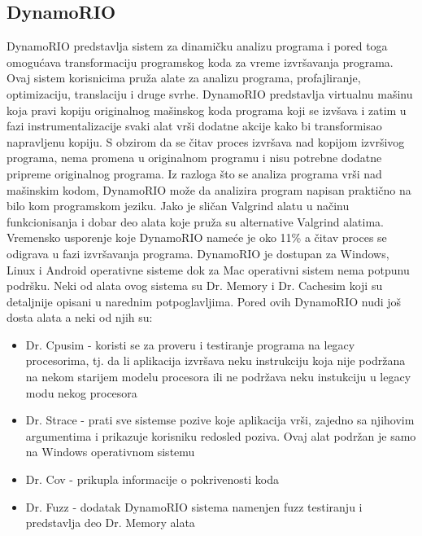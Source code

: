 \documentclass[a4paper]{article}
\begin{document}
\subsection{DynamoRIO}
DynamoRIO predstavlja sistem za dinamičku analizu programa i pored toga omogućava transformaciju programskog koda za vreme izvršavanja programa. Ovaj sistem korisnicima pruža alate za analizu programa, profajliranje, optimizaciju, translaciju i druge svrhe. DynamoRIO predstavlja virtualnu mašinu koja pravi kopiju originalnog mašinskog koda programa koji se izvšava i zatim u fazi instrumentalizacije svaki alat vrši dodatne akcije kako bi transformisao napravljenu kopiju. S obzirom da se čitav proces izvršava nad kopijom izvršivog programa, nema promena u originalnom programu i nisu potrebne dodatne pripreme originalnog programa. Iz razloga što se analiza programa vrši nad mašinskim kodom, DynamoRIO može da analizira program napisan praktično na bilo kom programskom jeziku. Jako je sličan Valgrind alatu u načinu funkcionisanja i dobar deo alata koje pruža su alternative Valgrind alatima. Vremensko usporenje koje DynamoRIO nameće je oko 11\% a čitav proces se odigrava u fazi izvršavanja programa. DynamoRIO je dostupan za Windows, Linux i Android operativne sisteme dok za Mac operativni sistem nema potpunu podršku. Neki od alata ovog sistema su Dr. Memory i Dr. Cachesim koji su detaljnije opisani u narednim potpoglavljima. Pored ovih DynamoRIO nudi još dosta alata a neki od njih su: \cite{dynamo-rio}
\begin{itemize}
    \item Dr. Cpusim - koristi se za proveru i testiranje programa na legacy procesorima, tj. da li aplikacija izvršava neku instrukciju koja nije podržana na nekom starijem modelu procesora ili ne podržava neku instukciju u legacy modu nekog procesora
    \item Dr. Strace - prati sve sistemse pozive koje aplikacija vrši, zajedno sa njihovim argumentima i prikazuje korisniku redosled poziva. Ovaj alat podržan je samo na Windows operativnom sistemu
    \item Dr. Cov - prikupla informacije o pokrivenosti koda 
    \item Dr. Fuzz - dodatak DynamoRIO sistema namenjen fuzz testiranju i predstavlja deo Dr. Memory alata 
\end{itemize}
\end{document}
